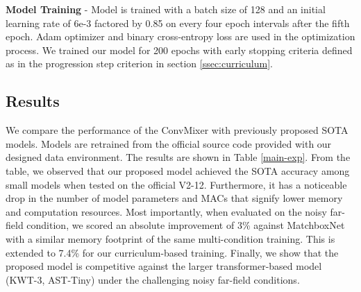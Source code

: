 \documentclass{article}
\begin{document}
\noindent
\textbf{Model Training} - Model is trained with a batch size of 128 and an initial learning rate of 6e-3 factored by 0.85 on every four epoch intervals after the fifth epoch. Adam optimizer and binary cross-entropy loss are used in the optimization process. We trained our model for 200 epochs with early stopping criteria defined as in the progression step criterion in section \ref{ssec:curriculum}. 

\subsection{Results}
\label{ssec:results}
We compare the performance of the ConvMixer with previously proposed SOTA models. Models are retrained from the official source code provided with our designed data environment. The results are shown in Table \ref{main-exp}. 
From the table, we observed that our proposed model achieved the SOTA accuracy among small models when tested on the official V2-12. Furthermore, it has a noticeable drop in the number of model parameters and MACs that signify lower memory and computation resources. 
Most importantly, when evaluated on the noisy far-field condition, we scored an absolute improvement of 3\% against MatchboxNet with a similar memory footprint of the same multi-condition training. This is extended to 7.4\% for our curriculum-based training. Finally, we show that the proposed model is competitive against the larger transformer-based model (KWT-3, AST-Tiny) under the challenging noisy far-field conditions.



\end{document}

